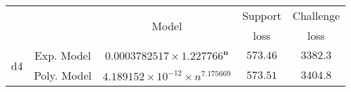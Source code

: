\begin{tabular}{ccccc} 
\hline 
 &  & \multirow{2}{*}{Model} & Support & Challenge\tabularnewline 
 &  &  & loss  & loss\tabularnewline 
\hline 
\hline 
\multirow{2}{*}{d4} & Exp. Model & $\mathbf{0.0003782517\times 1.227766^{n}}$ & $\mathbf{573.46}$ & $\mathbf{3382.3}$ \tabularnewline 
 & Poly. Model & $4.189152\times10^{-12}\times n^{7.175669}$ & $573.51$ & $3404.8$ \tabularnewline 
\hline 
\end{tabular} 

